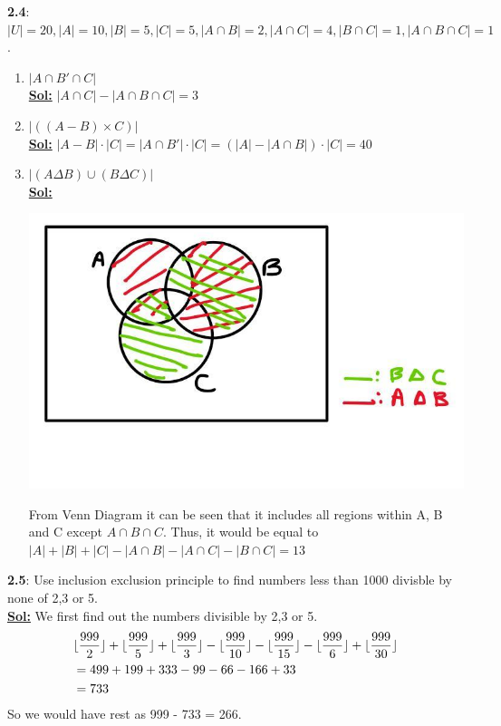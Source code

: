 \documentclass[xcolor=svgnames]{beamer}
\DeclarePairedDelimiter\floor{\lfloor}{\rfloor}
\begin{document}
\begin{frame}
    \textbf{2.4}: $|U| = 20, |A| = 10, |B| = 5, |C| = 5, |A \cap B| = 2, |A \cap C| = 4, |B \cap C| = 1, |A \cap B \cap C| = 1$.
\begin{enumerate}
    \item $|A \cap B' \cap C| $ \\
    \textbf{\underline{Sol:}} $|A \cap C| - |A \cap B \cap C| = 3$
    \item $|((A - B) \times C)|$ \\
    \textbf{\underline{Sol:}} $|A - B| \cdot |C| = |A \cap B'| \cdot |C| = (|A| - |A \cap B|) \cdot |C| = 40$
    \item $|(A \Delta B) \cup (B \Delta C) |$ \\ 
    \textbf{\underline{Sol:}}     
\begin{multicols}{2}
\begin{center}
    \includegraphics[width=\linewidth]{photo_2020-09-22_22-09-14.jpg}
\end{center}
From Venn Diagram it can be seen that it includes all regions within A, B and C except $A \cap B \cap C$. 
    Thus, it would be equal to $|A| + |B| + |C| - |A \cap B| - |A \cap C| - |B \cap C| = 13$
\end{multicols}    
    
\end{enumerate}

\end{frame}

\begin{frame}

\textbf{2.5}: Use inclusion exclusion principle to find numbers less than 1000 divisble by none of 2,3 or 5. 
\\ \textbf{\underline{Sol:}} We first find out the numbers divisible by 2,3 or 5.
\begin{align*}
    &\floor{\frac{999}{2}} + \floor{\frac{999}{5}} + \floor{\frac{999}{3}} - \floor{\frac{999}{10}} - \floor{\frac{999}{15}} - \floor{\frac{999}{6}} + \floor{\frac{999}{30}} \\
    &= 499 + 199 + 333 - 99 - 66 - 166 + 33 \\  
    &= 733
\end{align*}
So we would have rest as 999 - 733 = 266.
\end{frame}
\end{document}
